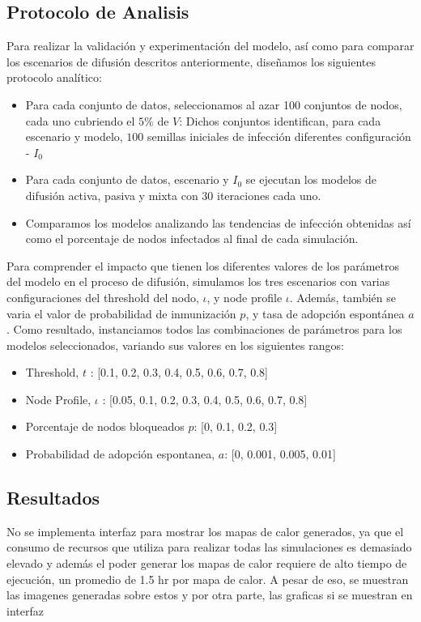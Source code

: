 \documentclass{article}
\begin{document}
\subsection{Protocolo de Analisis}
Para realizar la validación y experimentación del modelo, así como para comparar los escenarios de difusión descritos anteriormente, diseñamos los siguientes protocolo analítico:
\begin{itemize}
\item Para cada conjunto de datos, seleccionamos al azar 100 conjuntos de nodos, cada uno cubriendo el $5\%$ de $V$: Dichos conjuntos identifican, para cada escenario y modelo, $100$ semillas iniciales de infección diferentes configuración - $I_0$
\item Para cada conjunto de datos, escenario y $I_0$ se ejecutan los modelos de difusión activa, pasiva y mixta con 30 iteraciones cada uno.
\item Comparamos los modelos analizando las tendencias de infección obtenidas así como el porcentaje de nodos infectados al final de cada simulación.
\end{itemize}
Para comprender el impacto que tienen los diferentes valores de los parámetros del modelo en el proceso de difusión, simulamos los tres escenarios con varias configuraciones del threshold del nodo, $\iota$, y node profile $\iota$. Además, también se varia el valor de probabilidad de inmunización $p$, y tasa de adopción espontánea $a$. Como resultado, instanciamos todos las combinaciones de parámetros para los modelos seleccionados, variando sus valores en los siguientes rangos:

\begin{itemize}
\item Threshold, $t$ : [0.1, 0.2, 0.3, 0.4, 0.5, 0.6, 0.7, 0.8]
\item Node Profile, $\iota$ : [0.05, 0.1, 0.2, 0.3, 0.4, 0.5, 0.6, 0.7, 0.8]
\item Porcentaje de nodos bloqueados $p$: [0, 0.1, 0.2, 0.3]
\item Probabilidad de adopción espontanea, $a$: [0, 0.001, 0.005, 0.01]
\end{itemize}
\newpage
\subsection{Resultados}

No se implementa interfaz para mostrar los mapas de calor generados, ya que el consumo de recursos que utiliza para realizar todas las simulaciones es demasiado elevado y además el poder generar los mapas de calor requiere de alto tiempo de ejecución, un promedio de 1.5 hr por mapa de calor. A pesar de eso, se muestran las imagenes generadas sobre estos y por otra parte, las graficas si se muestran en interfaz 
\end{document}
